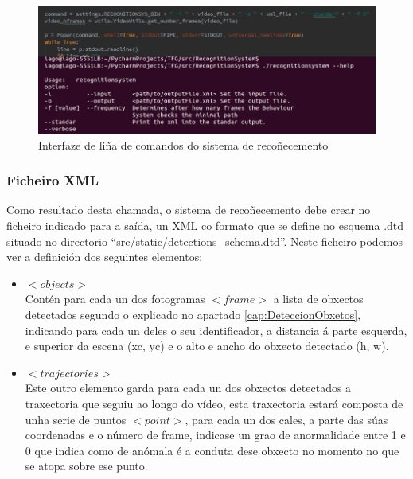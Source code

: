         \begin{figure}[htp]
        \begin{center}
            \includegraphics[scale=0.45]{figures/InterfazLineaComandos.png}
            \caption{Interfaze de liña de comandos do sistema de recoñecemento}
        \label{fig:InterfazLineaComandos}
        \end{center}
        \end{figure}
        
        \subsubsection{Ficheiro XML}
            Como resultado desta chamada, o sistema de recoñecemento debe crear no ficheiro indicado 
            para a saída, un XML co formato que se define no esquema .dtd situado no directorio
            ``src/static/detections\_schema.dtd''. Neste ficheiro podemos ver a definición dos 
            seguintes elementos:
            
            \begin{itemize}
            \item{{\textbf{$<objects>$\\}}}
                Contén para cada un dos fotogramas $<frame>$ a lista de obxectos detectados segundo
                o explicado no apartado \ref{cap:DeteccionObxetos}, indicando para cada un deles o 
                seu identificador, a distancia á parte esquerda, e superior da escena (xc, yc) e o 
                alto e ancho do obxecto detectado (h, w).
            \item{{\textbf{$<trajectories>$\\}}}
                Este outro elemento garda para cada un dos obxectos detectados a traxectoria que 
                seguiu ao longo do vídeo, esta traxectoria estará composta de unha serie de puntos
                $<point>$, para cada un dos cales, a parte das súas coordenadas e o número de 
                frame, indicase un grao de anormalidade entre 1 e 0 que indica como de anómala é 
                a conduta dese obxecto no momento no que se atopa sobre ese punto.
            \end{itemize}
            
